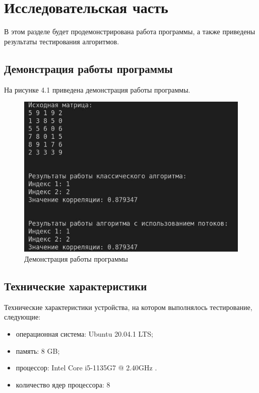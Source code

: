 \chapter{Исследовательская часть}
В этом разделе будет продемонстрирована работа программы, а также
приведены результаты тестирования алгоритмов.

\section{Демонстрация работы программы}
На рисунке 4.1 приведена демонстрация работы программы.

\FloatBarrier
\begin{figure}[h]
	\begin{center}
		\includegraphics[]{inc/demonstrate.jpg}
	\end{center}
	\caption{Демонстрация работы программы}
\end{figure}
\FloatBarrier

\section{Технические характеристики}
Технические характеристики устройства, на котором выполнялось тестирование, следующие:
\begin{itemize}
	\item операционная система: Ubuntu 20.04.1 LTS;
	\item память: 8 GB;
	\item процессор: Intel Core i5-1135G7 @ 2.40GHz \cite{intel}.
	\item количество ядер процессора: 8
\end{itemize}

